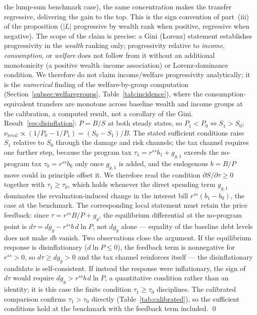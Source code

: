 \documentclass[12pt]{article}
\newcommand{\Sfun}{S}
\begin{document}
the lump-sum benchmark case), the same concentration makes the transfer
regressive, delivering the gain to the top. This is the sign convention of
part~(iii) of the proposition ($|L|$ progressive by wealth rank when positive,
regressive when negative).
The scope of the claim is precise: a Gini (Lorenz) statement establishes
progressivity in the \emph{wealth} ranking only; progressivity relative to
\emph{income}, \emph{consumption}, or \emph{welfare} does not follow from it
without an additional monotonicity (a positive wealth--income association) or
Lorenz-dominance condition. We therefore do not claim income/welfare
progressivity analytically; it is the \emph{numerical} finding of the
welfare-by-group computation (Section~\ref{subsec:welfaregroups},
Table~\ref{tab:incidence}), where the consumption-equivalent transfers are
monotone across baseline wealth and income groups at the calibration, a
computed result, not a corollary of the Gini. Result~\ref{res:disinflation}:
$P=B/\Sfun$ at both
steady states, so $P_1<P_0 \iff \Sfun_1>\Sfun_0$;
$\nu_{\mathrm{reval}}\propto(1/P_0-1/P_1)=(\Sfun_0-\Sfun_1)/B$. The stated
sufficient conditions raise $\Sfun_1$ relative to $\Sfun_0$ through the
damage and risk channels; the tax channel requires one further step, because
the program tax $\tau_1=r^{ss}b_1+g_{g,1}$ exceeds the no-program tax
$\tau_0=r^{ss}b_0$ only once $g_{g,1}$ is added, and the endogenous $b=B/P$
move could in principle offset it. We therefore read the condition
$\partial\Sfun/\partial\tau\ge0$ together with $\tau_1\ge\tau_0$, which
holds whenever the direct spending term $g_{g,1}$ dominates the
revaluation-induced change in the interest bill $r^{ss}(b_1-b_0)$, the case
at the benchmark. The corresponding local statement must retain the price
feedback: since $\tau = r^{ss}B/P + g_g$, the equilibrium differential at
the no-program point is $d\tau = dg_g - r^{ss} b\, d\ln P$, not
$dg_g$ alone --- equality of the baseline debt levels does not make $db$
vanish. Two observations close the argument. If the equilibrium response is
disinflationary ($d\ln P\le0$), the feedback term is nonnegative for
$r^{ss}>0$, so $d\tau \ge dg_g > 0$ and the tax channel reinforces itself
--- the disinflationary candidate is self-consistent. If instead the
response were inflationary, the sign of $d\tau$ would require
$dg_g > r^{ss} b\, d\ln P$, a quantitative condition rather than an
identity; it is this case the finite condition $\tau_1\ge\tau_0$
disciplines. The calibrated comparison confirms $\tau_1>\tau_0$ directly
(Table~\ref{tab:calibrated}), so the sufficient conditions hold at the
benchmark with the feedback term included. \qed
\end{document}
